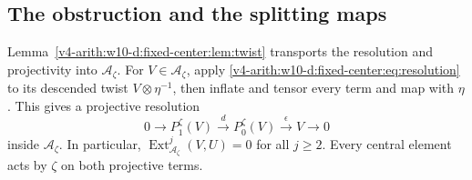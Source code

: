 \subsection{The obstruction and the splitting maps}

Lemma~\ref{v4-arith:w10-d:fixed-center:lem:twist} transports the resolution and projectivity into $\mathcal A_\zeta$.
For $V\in\mathcal A_\zeta$, apply \eqref{v4-arith:w10-d:fixed-center:eq:resolution} to its descended twist $V\otimes\eta^{-1}$,
then inflate and tensor every term and map with $\eta$.
This gives a projective resolution
\[
 0\longrightarrow P_1^\zeta(V)\xrightarrow{d}P_0^\zeta(V)
 \xrightarrow{\epsilon}V\longrightarrow0
\]
inside $\mathcal A_\zeta$.
In particular, $\operatorname{Ext}^j_{\mathcal A_\zeta}(V,U)=0$ for all $j\ge2$.
Every central element acts by $\zeta$ on both projective terms.

